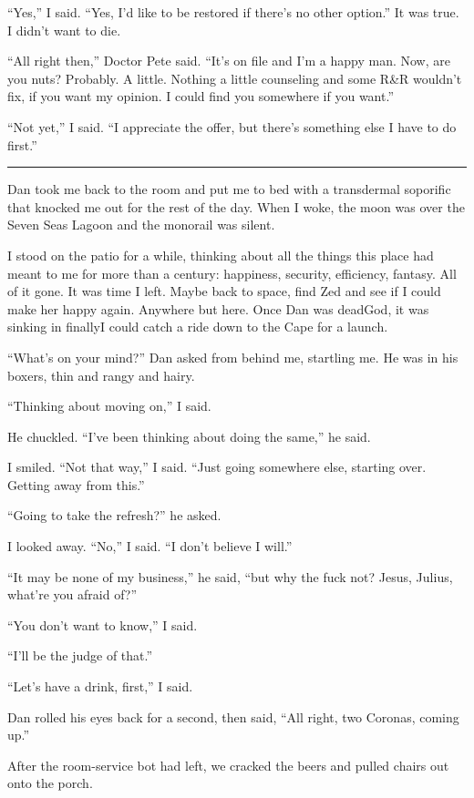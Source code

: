 “Yes,” I said. “Yes, I'd like to be restored if there's no other
option.” It was true. I didn't want to die.

“All right then,” Doctor Pete said. “It's on file and I'm a happy
man. Now, are you nuts? Probably. A little. Nothing a little
counseling and some R\&R wouldn't fix, if you want my opinion. I
could find you somewhere if you want.”

“Not yet,” I said. “I appreciate the offer, but there's something
else I have to do first.”

\begin{center}\rule{1in}{0.4pt}\end{center}

Dan took me back to the room and put me to bed with a transdermal
soporific that knocked me out for the rest of the day. When I woke,
the moon was over the Seven Seas Lagoon and the monorail was
silent.

I stood on the patio for a while, thinking about all the things
this place had meant to me for more than a century: happiness,
security, efficiency, fantasy. All of it gone. It was time I left.
Maybe back to space, find Zed and see if I could make her happy
again. Anywhere but here. Once Dan was dead{\dash}God, it was sinking in
finally{\dash}I could catch a ride down to the Cape for a launch.

“What's on your mind?” Dan asked from behind me, startling me. He
was in his boxers, thin and rangy and hairy.

“Thinking about moving on,” I said.

He chuckled. “I've been thinking about doing the same,” he said.

I smiled. “Not that way,” I said. “Just going somewhere else,
starting over. Getting away from this.”

“Going to take the refresh?” he asked.

I looked away. “No,” I said. “I don't believe I will.”

“It may be none of my business,” he said, “but why the fuck not?
Jesus, Julius, what're you afraid of?”

“You don't want to know,” I said.

“I'll be the judge of that.”

“Let's have a drink, first,” I said.

Dan rolled his eyes back for a second, then said, “All right, two
Coronas, coming up.”

After the room-service bot had left, we cracked the beers and
pulled chairs out onto the porch.

